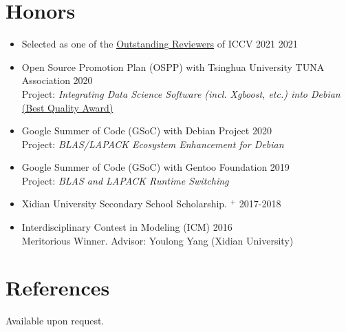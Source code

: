 \documentclass[10pt,margin,line,pifont,palatino,courier]{res}
\begin{document}
\begin{resume}
\section{\sc Honors}

\begin{itemize}[leftmargin=*]
	\item Selected as one of the \href{http://iccv2021.thecvf.com/outstanding-reviewers}{\underline{Outstanding Reviewers}} of ICCV 2021 \hfill 2021
	\item Open Source Promotion Plan (OSPP) with Tsinghua University TUNA Association \hfill 2020\\
		Project: \textit{Integrating Data Science Software (incl. Xgboost, etc.) into Debian}\\
		\href{https://isrc.iscas.ac.cn/summer2020/#/announcement}{(Best Quality Award)}
	\item Google Summer of Code (GSoC) with Debian Project \hfill 2020\\
		Project: \textit{BLAS/LAPACK Ecosystem Enhancement for Debian}
	\item Google Summer of Code (GSoC) with Gentoo Foundation \hfill 2019\\
		Project: \textit{BLAS and LAPACK Runtime Switching}
	\item Xidian University Secondary School Scholarship.%
		\href{http://see.xidian.edu.cn/html/news/9732.html}{$^+$} \hfill 2017-2018
	\item Interdisciplinary Contest in Modeling (ICM) \hfill 2016\\
		Meritorious Winner. Advisor: Youlong Yang (Xidian University)
\end{itemize}


%

\section{\sc References}
{\sc Available upon request.}

%


\end{resume}
\end{document}
